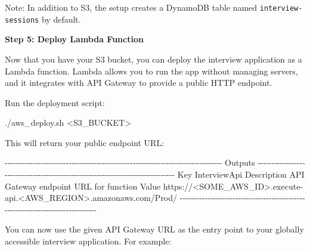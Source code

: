 \documentclass[
  letterpaper,
  DIV=11,
  numbers=noendperiod]{scrartcl}
\newenvironment{Shaded}{\begin{snugshade}}{\end{snugshade}}
\newcommand{\ExtensionTok}[1]{\textcolor[rgb]{0.00,0.23,0.31}{#1}}
\newcommand{\NormalTok}[1]{\textcolor[rgb]{0.00,0.23,0.31}{#1}}
\newcommand{\OperatorTok}[1]{\textcolor[rgb]{0.37,0.37,0.37}{#1}}
\begin{document}
Note: In addition to S3, the setup creates a DynamoDB table named
\texttt{interview-sessions} by default.

\textbf{Step 5: Deploy Lambda Function}

Now that you have your S3 bucket, you can deploy the interview
application as a Lambda function. Lambda allows you to run the app
without managing servers, and it integrates with API Gateway to provide
a public HTTP endpoint.

Run the deployment script:

\begin{Shaded}
\begin{Highlighting}[]
\ExtensionTok{./aws\_deploy.sh} \OperatorTok{\textless{}}\NormalTok{S3\_BUCKET}\OperatorTok{\textgreater{}}
\end{Highlighting}
\end{Shaded}

This will return your public endpoint URL:

\begin{Shaded}
\begin{Highlighting}[]
\ExtensionTok{{-}{-}{-}{-}{-}{-}{-}{-}{-}{-}{-}{-}{-}{-}{-}{-}{-}{-}{-}{-}{-}{-}{-}{-}{-}{-}{-}{-}{-}{-}{-}{-}{-}{-}{-}{-}{-}{-}{-}{-}{-}{-}{-}{-}{-}{-}{-}{-}{-}{-}{-}{-}{-}{-}{-}{-}{-}{-}{-}{-}{-}{-}{-}{-}{-}{-}{-}{-}{-}{-}{-}{-}{-}{-}{-}{-}{-}{-}}
\ExtensionTok{Outputs}
\ExtensionTok{{-}{-}{-}{-}{-}{-}{-}{-}{-}{-}{-}{-}{-}{-}{-}{-}{-}{-}{-}{-}{-}{-}{-}{-}{-}{-}{-}{-}{-}{-}{-}{-}{-}{-}{-}{-}{-}{-}{-}{-}{-}{-}{-}{-}{-}{-}{-}{-}{-}{-}{-}{-}{-}{-}{-}{-}{-}{-}{-}{-}{-}{-}{-}{-}{-}{-}{-}{-}{-}{-}{-}{-}{-}{-}{-}{-}{-}{-}}
\ExtensionTok{Key}\NormalTok{         InterviewApi}
\ExtensionTok{Description}\NormalTok{ API Gateway endpoint URL for function}
\ExtensionTok{Value}\NormalTok{       https://}\OperatorTok{\textless{}}\NormalTok{SOME\_AWS\_ID}\OperatorTok{\textgreater{}}\NormalTok{.execute{-}api.}\OperatorTok{\textless{}}\NormalTok{AWS\_REGION}\OperatorTok{\textgreater{}}\NormalTok{.amazonaws.com/Prod/}
\ExtensionTok{{-}{-}{-}{-}{-}{-}{-}{-}{-}{-}{-}{-}{-}{-}{-}{-}{-}{-}{-}{-}{-}{-}{-}{-}{-}{-}{-}{-}{-}{-}{-}{-}{-}{-}{-}{-}{-}{-}{-}{-}{-}{-}{-}{-}{-}{-}{-}{-}{-}{-}{-}{-}{-}{-}{-}{-}{-}{-}{-}{-}{-}{-}{-}{-}{-}{-}{-}{-}{-}{-}{-}{-}{-}{-}{-}{-}{-}{-}}
\end{Highlighting}
\end{Shaded}

You can now use the given API Gateway URL as the entry point to your
globally accessible interview application. For example:
\end{document}
